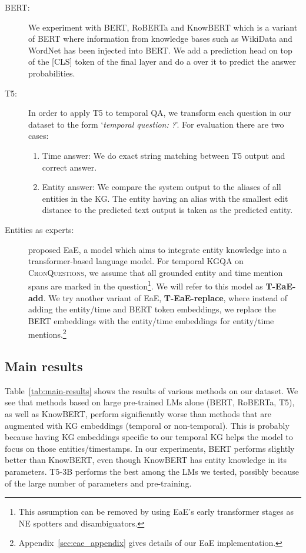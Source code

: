 \documentclass[11pt,a4paper]{article}
\newcommand{\dataset}{\textsc{CronQuestions}}
\begin{document}
\begin{description}
\item[BERT:] We experiment with BERT, RoBERTa \citep{liu2019roberta} and Know\-BERT \citep{peters2019knowledge} which is a variant of BERT where information from knowledge bases such as WikiData and WordNet has been injected into BERT. 
We add a prediction head on top of the [CLS] token of the final layer and do a  over it to predict the answer probabilities.

\item[T5:] In order to apply T5 \citep{raffel2020exploring} to temporal QA, we transform each question in our dataset to the form `\textit{temporal question: }\textit{?}'. For evaluation there are two cases:
\begin{enumerate}
    \item Time answer: We do exact string matching between T5 output and correct answer.
    \item Entity answer: We compare the system output to the aliases of all entities in the KG. The entity having an alias with the smallest edit distance \citep{levenshtein1966binary} to the predicted text output is taken as the predicted entity.
\end{enumerate}

\item[Entities as experts:]\citet{fevry2020entexperts} proposed EaE, a model which aims to integrate entity knowledge into a transformer-based language model.
For temporal KGQA on \dataset{}, we assume that all grounded entity and time mention spans are marked in the question\footnote{This assumption can be removed by using EaE's early transformer stages as NE spotters and disambiguators.}. We will refer to this model as \textbf{T-EaE-add}. We try another variant of EaE, \textbf{T-EaE-replace}, where instead of adding the entity/time and BERT token embeddings, we replace the BERT embeddings with the entity/time embeddings for entity/time mentions.\footnote{Appendix~\ref{sec:eae_appendix} gives details of our EaE implementation.}

\end{description}




\subsection{Main results}
\label{sec:main-results}
Table~\ref{tab:main-results} shows the results of various methods on our dataset. We see that methods based on large pre-trained LMs alone (BERT, RoBERTa, T5), as well as KnowBERT, perform significantly worse than methods that are augmented with KG embeddings (temporal or non-temporal). This is probably because having KG embeddings specific to our temporal KG helps the model to focus on those entities/timestamps. In our experiments, BERT performs slightly better than KnowBERT, even though KnowBERT has entity knowledge in its parameters. T5-3B performs the best among the LMs we tested, possibly because of the large number of parameters and pre-training.
\end{document}
